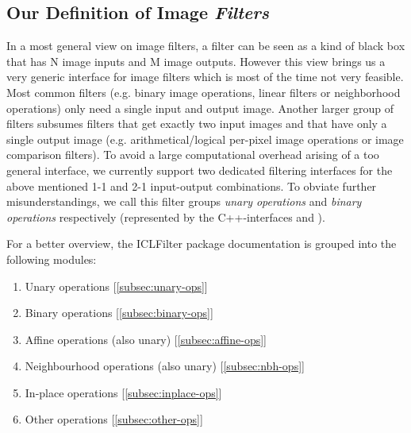 \subsection{Our Definition of Image \emph{Filters}}

In a most general view on image filters, a filter can be seen as a kind of black box that has N image inputs and M image outputs. However this view brings us a very generic interface for image filters which is most of the time not very feasible. \\
Most common filters (e.g. binary image operations, linear filters or neighborhood operations) only need a single input and output image. Another larger group of filters subsumes filters that get exactly two input images and that have only a single output image (e.g. arithmetical/logical per-pixel image operations or image comparison filters).
To avoid a large computational overhead arising of a too general interface, we currently support two dedicated filtering interfaces for the above mentioned 1-1 and 2-1 input-output combinations. To obviate further misunderstandings, we call this filter groups \emph{unary operations} and \emph{binary operations} respectively (represented by the C++-interfaces  and ).

For a better overview, the ICLFilter package documentation is grouped into the following modules:

\begin{enumerate}
\item Unary operations [\ref{subsec:unary-ops}]
\item Binary operations [\ref{subsec:binary-ops}]
\item Affine operations (also unary) [\ref{subsec:affine-ops}]
\item Neighbourhood operations (also unary) [\ref{subsec:nbh-ops}]
\item In-place operations [\ref{subsec:inplace-ops}] 
\item Other operations [\ref{subsec:other-ops}]
\end{enumerate}


